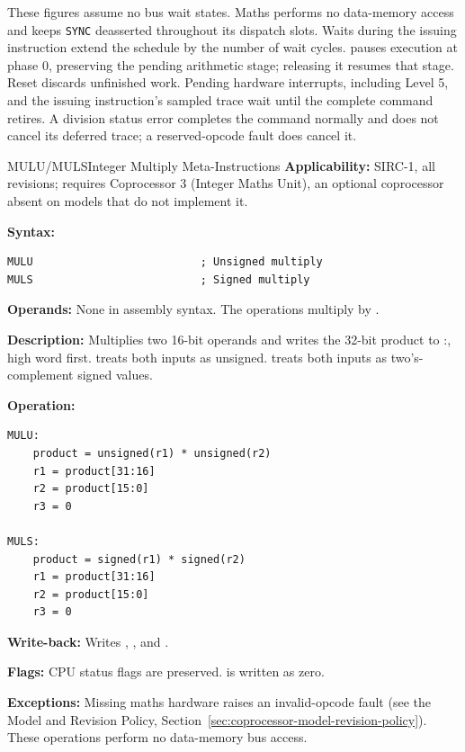 These figures assume no bus wait states. Maths performs no data-memory access and keeps \texttt{SYNC} deasserted
throughout its dispatch slots. Waits during the issuing instruction extend the schedule by the number of wait cycles.
 pauses execution at phase 0, preserving the pending arithmetic stage; releasing it resumes that stage.
Reset discards unfinished work. Pending hardware interrupts, including Level 5, and the issuing instruction's sampled
trace wait until the complete command retires. A division status error completes the command normally and does not
cancel its deferred trace; a reserved-opcode fault does cancel it.

\begin{instructionbox}{MULU/MULS}{Integer Multiply Meta-Instructions}
	\textbf{Applicability:} SIRC-1, all revisions; requires Coprocessor 3 (Integer Maths Unit), an optional
	coprocessor absent on models that do not implement it.

	\textbf{Syntax:}
	\begin{lstlisting}
MULU                          ; Unsigned multiply
MULS                          ; Signed multiply
\end{lstlisting}

	\textbf{Operands:} None in assembly syntax. The operations multiply  by .

	\textbf{Description:} Multiplies two 16-bit operands and writes the 32-bit product to :, high word
	first.  treats both inputs as unsigned.  treats both inputs as two's-complement signed
	values.

	\textbf{Operation:}
	\begin{verbatim}
MULU:
    product = unsigned(r1) * unsigned(r2)
    r1 = product[31:16]
    r2 = product[15:0]
    r3 = 0

MULS:
    product = signed(r1) * signed(r2)
    r1 = product[31:16]
    r2 = product[15:0]
    r3 = 0
\end{verbatim}

	\textbf{Write-back:} Writes , , and .

	\textbf{Flags:} CPU status flags are preserved.  is written as zero.

	\textbf{Exceptions:} Missing maths hardware raises an invalid-opcode fault (see the Model and Revision Policy,
	Section~\ref{sec:coprocessor-model-revision-policy}). These operations perform no data-memory bus access.


\end{instructionbox}

